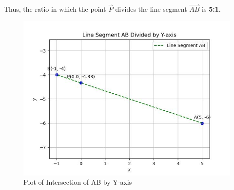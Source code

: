 \documentclass[journal]{IEEEtran}
\begin{document}
Thus, the ratio in which the point $\vec{P}$ divides the line segment $\vec{AB}$ is \textbf{5:1}.

\begin{figure}
    \centering
    \includegraphics[width=0.7\columnwidth]{figs/plot_c.jpg}
    \caption*{Plot of Intersection of AB by Y-axis}
    \label{fig:fig}
\end{figure}
\end{document}
